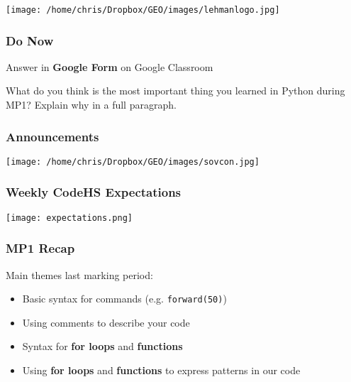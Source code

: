 
\date{ }









\begin{frame}
  \titlepage
  
  \begin{center}
\texttt{[image: /home/chris/Dropbox/GEO/images/lehmanlogo.jpg]}
\end{center}
\end{frame}



\begin{frame}
\frametitle<presentation>{ Do Now}
Answer in \textbf{Google Form} on Google Classroom
\begin{tcolorbox}[colback=blue!5,colframe=red!40!black ]
What do you think is  the most important thing you learned in Python during MP1? Explain why in a full paragraph.
\end{tcolorbox}
\end{frame}






\begin{frame}
\frametitle<presentation>{Announcements}
\vspace{-1cm}
\hspace{4cm}
\texttt{[image: /home/chris/Dropbox/GEO/images/sovcon.jpg]}
\reminders

\end{frame}

\begin{frame}
\frametitle<presentation>{Weekly CodeHS Expectations}
\texttt{[image: expectations.png]}
\end{frame}


\begin{frame}
\frametitle<presentation>{MP1 Recap}
Main themes last marking period:

\begin{itemize}
	\item<1-> Basic syntax for commands (e.g. \texttt{forward(50)})
	\item Using comments to describe your code
	\item Syntax for \textbf{for loops} and \textbf{functions}
	\item Using \textbf{for loops} and \textbf{functions} to express patterns in our code
\end{itemize}
\end{frame}


